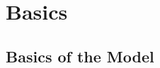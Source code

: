 \documentclass[conference]{IEEEtran}
\begin{document}







\section{Basics}

\subsection {Basics of the Model}
\end{document}
